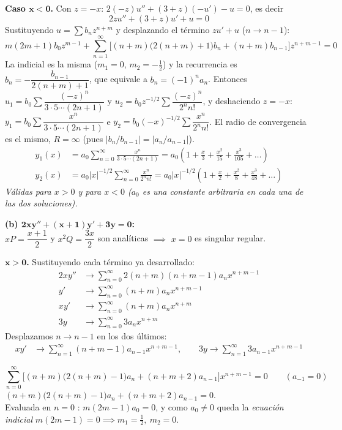 \documentclass[11pt, a4paper]{article}
\begin{document}
\vspace{0.2cm}\noindent\textbf{Caso $\bm{x<0}$.} Con $z=-x$: $2(-z)u''+(3+z)(-u')-u=0$, es decir
\[
2zu''+(3+z)u'+u=0
\]
Sustituyendo $u=\sum b_nz^{n+m}$ y desplazando el término $zu'+u$ ($n\to n-1$):
\[
m(2m+1)b_0z^{m-1}+\sum_{n=1}^\infty\Big[(n+m)\big(2(n+m)+1\big)b_n+(n+m)b_{n-1}\Big]z^{n+m-1}=0
\]
La indicial es la misma ($m_1=0$, $m_2=-\tfrac12$) y la recurrencia es $b_n=-\dfrac{b_{n-1}}{2(n+m)+1}$, que equivale a $b_n=(-1)^na_n$. Entonces $u_1=b_0\sum\dfrac{(-z)^n}{3\cdot5\cdots(2n+1)}$ y $u_2=b_0z^{-1/2}\sum\dfrac{(-z)^n}{2^nn!}$, y deshaciendo $z=-x$: $y_1=b_0\sum\dfrac{x^n}{3\cdot5\cdots(2n+1)}$ e $y_2=b_0(-x)^{-1/2}\sum\dfrac{x^n}{2^nn!}$. El radio de convergencia es el mismo, $R=\infty$ (pues $|b_n/b_{n-1}|=|a_n/a_{n-1}|$).
\[
\boxed{\begin{aligned}
y_1(x)&=a_0\sum_{n=0}^\infty\frac{x^n}{3\cdot5\cdots(2n+1)}=a_0\left(1+\frac{x}{3}+\frac{x^2}{15}+\frac{x^3}{105}+\dots\right) \\[2pt]
y_2(x)&=a_0|x|^{-1/2}\sum_{n=0}^\infty\frac{x^n}{2^nn!}=a_0|x|^{-1/2}\left(1+\frac{x}{2}+\frac{x^2}{8}+\frac{x^3}{48}+\dots\right)
\end{aligned}}
\]
\textit{Válidas para $x>0$ y para $x<0$ ($a_0$ es una constante arbitraria en cada una de las dos soluciones).}

\medskip
\noindent\textbf{(b) $\bm{2xy''+(x+1)y'+3y=0}$:} \\
$xP=\dfrac{x+1}{2}$ y $x^2Q=\dfrac{3x}{2}$ son analíticas $\implies$ $x=0$ es singular regular.

\vspace{0.2cm}\noindent\textbf{ $\bm{x>0}$.} Sustituyendo cada término ya desarrollado:
\begin{align*}
2xy'' &\to \sum_{n=0}^\infty 2(n+m)(n+m-1)a_nx^{n+m-1} \\
y' &\to \sum_{n=0}^\infty (n+m)a_nx^{n+m-1} \\
xy' &\to \sum_{n=0}^\infty (n+m)a_nx^{n+m} \\
3y &\to \sum_{n=0}^\infty 3a_nx^{n+m}
\end{align*}
Desplazamos $n\to n-1$ en los dos últimos:
\begin{align*}
xy' &\to \sum_{n=1}^\infty (n+m-1)a_{n-1}x^{n+m-1}, \qquad 3y \to \sum_{n=1}^\infty 3a_{n-1}x^{n+m-1}
\end{align*}

\[
\sum_{n=0}^\infty\Big[(n+m)\big(2(n+m)-1\big)a_n+(n+m+2)a_{n-1}\Big]x^{n+m-1}=0 \qquad (a_{-1}=0)
\]
$(n+m)\big(2(n+m)-1\big)a_n+(n+m+2)a_{n-1}=0$.\\
\smallskip\noindent Evaluada en $n=0$ : $m(2m-1)a_0=0$, y como $a_0\neq0$ queda la \emph{ecuación indicial} $m(2m-1)=0 \implies m_1=\tfrac12,\ m_2=0$.
\end{document}
